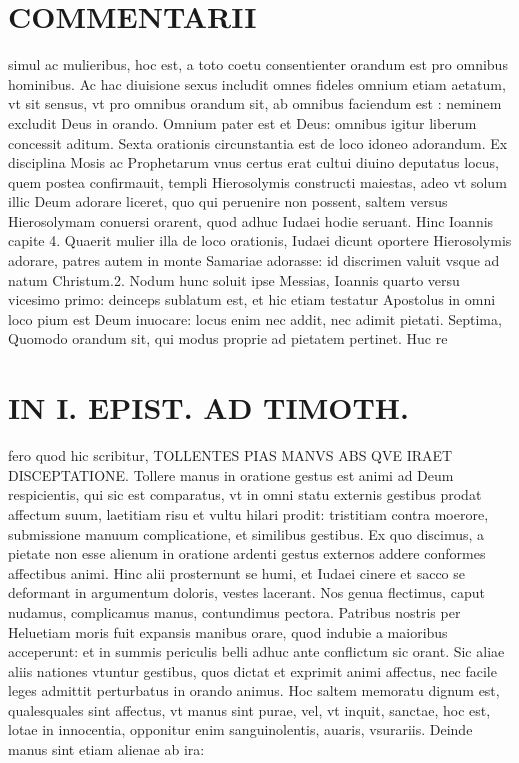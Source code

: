 \documentclass{article}
\begin{document}
\begin{pages}
\section*{COMMENTARII }
\marginpar{[ p.52 ]}\pstart simul ac mulieribus, hoc est, a toto coetu consentienter orandum est pro omnibus hominibus. Ac hac diuisione sexus includit omnes fideles omnium etiam aetatum, vt sit sensus, vt pro omnibus orandum sit, ab omnibus faciendum est : neminem excludit Deus in orando. Omnium pater est et Deus: omnibus igitur liberum concessit aditum.  \pend\pstart Sexta orationis circunstantia est de loco idoneo adorandum. Ex disciplina Mosis ac Prophetarum vnus certus erat cultui diuino deputatus locus, quem postea confirmauit, templi Hierosolymis constructi maiestas, adeo vt solum illic Deum adorare liceret, quo qui peruenire non possent, saltem versus Hierosolymam conuersi orarent, quod adhuc Iudaei hodie seruant. Hinc Ioannis capite 4. Quaerit mulier illa de loco orationis, Iudaei dicunt oportere Hierosolymis adorare, patres autem in monte Samariae adorasse: id discrimen valuit vsque ad natum Christum.2. Nodum hunc soluit ipse Messias, Ioannis quarto versu vicesimo primo: deinceps sublatum est, et hic etiam testatur Apostolus in omni loco pium est Deum inuocare: locus enim nec addit, nec adimit pietati.  \pend\pstart Septima, Quomodo orandum sit, qui modus proprie ad pietatem pertinet. Huc re\pend
\section*{IN I. EPIST. AD TIMOTH. }
\marginpar{[ p.53 ]}\pstart fero quod hic scribitur, TOLLENTES PIAS MANVS ABS QVE IRAET DISCEPTATIONE. Tollere manus in oratione gestus est animi ad Deum respicientis, qui sic est comparatus, vt in omni statu externis gestibus prodat affectum suum, laetitiam risu et vultu hilari prodit: tristitiam contra moerore, submissione manuum complicatione, et similibus gestibus. Ex quo discimus, a pietate non esse alienum in oratione ardenti gestus externos addere conformes affectibus animi. Hinc alii prosternunt se humi, et Iudaei cinere et sacco se deformant in argumentum doloris, vestes lacerant. Nos genua flectimus, caput nudamus, complicamus manus, contundimus pectora. Patribus nostris per Heluetiam moris fuit expansis manibus orare, quod indubie a maioribus acceperunt: et in summis periculis belli adhuc ante conflictum sic orant.  \pend\pstart Sic aliae aliis nationes vtuntur gestibus, quos dictat et exprimit animi affectus, nec facile leges admittit perturbatus in orando animus.  \pend\pstart Hoc saltem memoratu dignum est, qualesquales sint affectus, vt manus sint purae, vel, vt inquit, sanctae, hoc est, lotae in innocentia, opponitur enim sanguinolentis, auaris, vsurariis. Deinde manus sint etiam alienae ab ira:  \pend

\end{pages}
\end{document}
